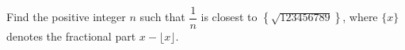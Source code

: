 Find the positive integer $n$ such that $\dfrac{1}{n}$ is closest to $\left\{\sqrt{123456789}\right\}$, where $\{x\}$ denotes the fractional part $x-\lfloor x\rfloor$.
